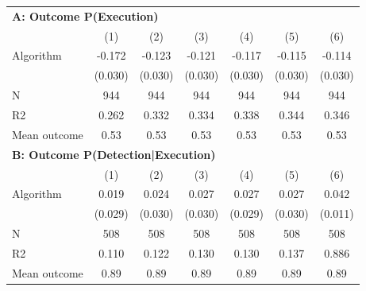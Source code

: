 \begin{tabular}{lcccccc} \toprule
\multicolumn{7}{l}{\textbf{A: Outcome P(Execution)}} \\ \multicolumn{1}{l}{} & (1) & (2) & (3) & (4) & (5) & (6) \\ \midrule
Algorithm   &      -0.172\sym{***}&      -0.123\sym{***}&      -0.121\sym{***}&      -0.117\sym{***}&      -0.115\sym{***}&      -0.114\sym{***}\\
            &     (0.030)         &     (0.030)         &     (0.030)         &     (0.030)         &     (0.030)         &     (0.030)         \\
\midrule
N           &         944         &         944         &         944         &         944         &         944         &         944         \\
R2          &       0.262         &       0.332         &       0.334         &       0.338         &       0.344         &       0.346         \\
Mean outcome&        0.53         &        0.53         &        0.53         &        0.53         &        0.53         &        0.53         \\

\midrule \multicolumn{7}{l}{\textbf{B: Outcome P(Detection|Execution)}} \\ \multicolumn{1}{l}{} & (1) & (2) & (3) & (4) & (5) & (6) \\ \midrule
Algorithm   &       0.019         &       0.024         &       0.027         &       0.027         &       0.027         &       0.042\sym{***}\\
            &     (0.029)         &     (0.030)         &     (0.030)         &     (0.029)         &     (0.030)         &     (0.011)         \\
\midrule
N           &         508         &         508         &         508         &         508         &         508         &         508         \\
R2          &       0.110         &       0.122         &       0.130         &       0.130         &       0.137         &       0.886         \\
Mean outcome&        0.89         &        0.89         &        0.89         &        0.89         &        0.89         &        0.89         \\


\end{tabular}
